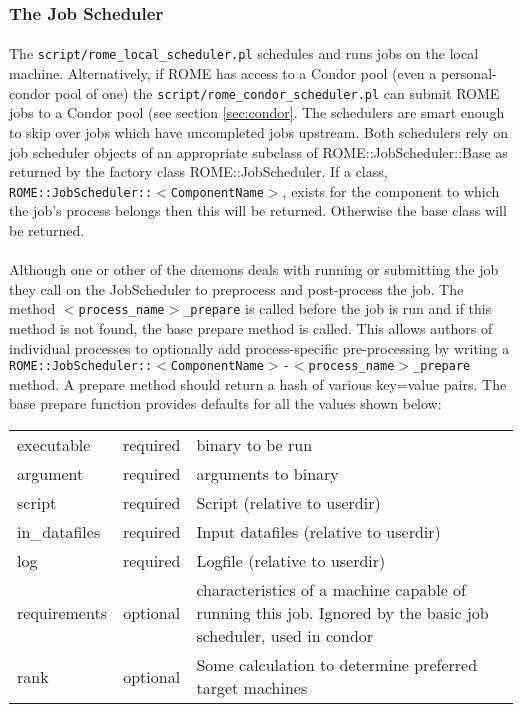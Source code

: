 \subsubsection{The Job Scheduler}
\label{sec:job_scheduling}

\paragraph{}
The \texttt{script/rome\_local\_scheduler.pl} schedules and runs jobs on the local machine. Alternatively, if ROME has access to a Condor pool (even a personal-condor pool of one) the \texttt{script/rome\_condor\_scheduler.pl} can submit ROME jobs to a Condor pool (see section \ref{sec:condor}. The schedulers are smart enough to skip over jobs which have uncompleted jobs upstream. Both schedulers rely on job scheduler objects of an appropriate subclass of ROME::JobScheduler::Base as returned by the factory class ROME::JobScheduler. If a class, \texttt{ROME::JobScheduler::$<$ComponentName$>$}, exists for the component to which the job's process belongs then this will be returned. Otherwise the base class will be returned. 

\paragraph{}
Although one or other of the daemons deals with running or submitting the job they call on the JobScheduler to preprocess and post-process the job. The method \texttt{$<$process\_name$>$\_prepare} is called before the job is run and if this method is not found, the base prepare method is called. This allows authors of individual processes to optionally add process-specific pre-processing by writing a \texttt{ROME::JobScheduler::$<$ComponentName$>$-$<$process\_name$>$\_prepare} method. A prepare method should return a hash of various key=value pairs. The base prepare function provides defaults for all the values shown below:

\begin{scriptsize}
\begin{tabular}{l|c|l}
executable & required & binary to be run \\
argument&required&arguments to binary\\
script&required&Script (relative to userdir)\\
in\_datafiles&required&Input datafiles (relative to userdir)\\
log&required&Logfile (relative to userdir)\\
requirements&optional&characteristics of a machine capable of running this job. Ignored by the basic job scheduler, used in condor\\
rank&optional&Some calculation to determine preferred target machines \\
\end{tabular}
\end{scriptsize}


